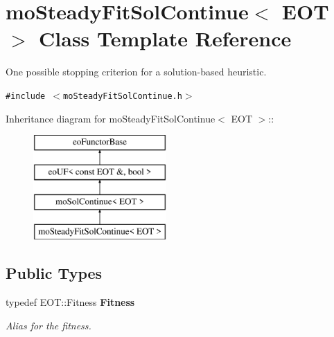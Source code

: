 \section{moSteadyFitSolContinue$<$ EOT $>$ Class Template Reference}
\label{classmo_steady_fit_sol_continue}
One possible stopping criterion for a solution-based heuristic.  


{\tt \#include $<$moSteadyFitSolContinue.h$>$}

Inheritance diagram for moSteadyFitSolContinue$<$ EOT $>$::\begin{figure}[H]
\begin{center}
\leavevmode
\includegraphics[height=4cm]{classmo_steady_fit_sol_continue}
\end{center}
\end{figure}
\subsection*{Public Types}
\begin{CompactItemize}
\item 
typedef EOT::Fitness {\bf Fitness}\label{classmo_steady_fit_sol_continue_c289721abbbafe50f6e3b8305dd31007}

\begin{CompactList}\small\item\em Alias for the fitness. \item\end{CompactList}\end{CompactItemize}
